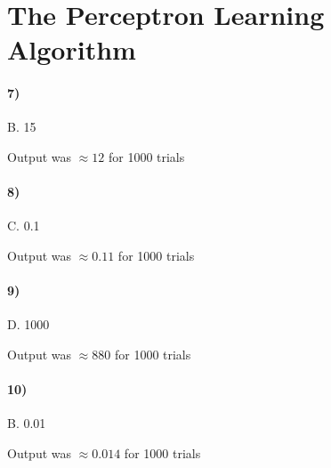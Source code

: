 \documentclass[10pt,letter]{article}
\begin{document}
\section*{The Perceptron Learning Algorithm}

\paragraph{7)} B. 15

	Output was $\approx 12$ for 1000 trials

\paragraph{8)} C. 0.1

	Output was $\approx 0.11$ for 1000 trials

\paragraph{9)} D. 1000

	Output was $\approx 880$ for 1000 trials

\paragraph{10)} B. 0.01

	Output was $\approx 0.014$ for 1000 trials
\end{document}
